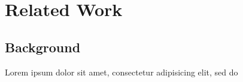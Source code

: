 \chapter{Related Work}
\label{chapter:related-work}


\section{Background}

Lorem ipsum dolor sit amet, consectetur adipisicing elit, sed do



